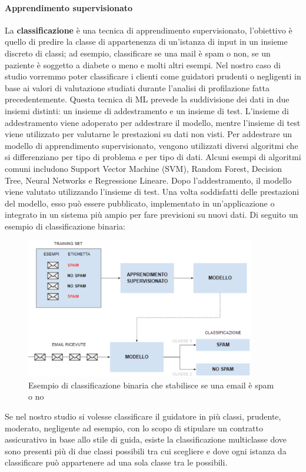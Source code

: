 \documentclass[12pt, a4paper, italian]{report}
\numberwithin{figure}{chapter}
\numberwithin{table}{chapter}
\begin{document}
\paragraph{Apprendimento supervisionato}
La \textbf{classificazione} è una tecnica di apprendimento supervisionato, l'obiettivo è quello di predire la classe di appartenenza di un'istanza di input in un insieme discreto di classi; ad esempio, classificare se una mail è spam o non, se un paziente è soggetto a diabete o meno e molti altri esempi. Nel nostro caso di studio vorremmo poter classificare i clienti come guidatori prudenti o negligenti in base ai valori di valutazione studiati durante l'analisi di profilazione fatta precedentemente. Questa tecnica di ML prevede la suddivisione dei dati in due insiemi distinti: un insieme di addestramento e un insieme di test. L'insieme di addestramento viene adoperato per addestrare il modello, mentre l'insieme di test viene utilizzato per valutarne le prestazioni su dati non visti. Per addestrare un modello di apprendimento supervisionato, vengono utilizzati diversi algoritmi che si differenziano per tipo di problema e per tipo di dati. Alcuni esempi di algoritmi comuni includono Support Vector Machine (SVM), Random Forest, Decision Tree, Neural Networks e Regressione Lineare. Dopo l'addestramento, il modello viene valutato utilizzando l'insieme di test. Una volta soddisfatti delle prestazioni del modello, esso può essere pubblicato, implementato in un'applicazione o integrato in un sistema più ampio per fare previsioni su nuovi dati. Di seguito un esempio di classificazione binaria: 

\begin{figure}[h] \centering
\includegraphics[width=10cm]{Classificazione.png}
\caption{Esempio di classificazione binaria che stabilisce se una email è spam o no\protect\footnotemark}
\label{fig:qualcosa}
\end{figure}
Se nel nostro studio si volesse classificare il guidatore in più classi, prudente, moderato, negligente ad esempio, con lo scopo di stipulare un contratto assicurativo in base allo stile di guida, esiste la classificazione multiclasse dove sono presenti più di due classi possibili tra cui scegliere e dove ogni istanza da classificare può appartenere ad una sola classe tra le possibili.
\end{document}
